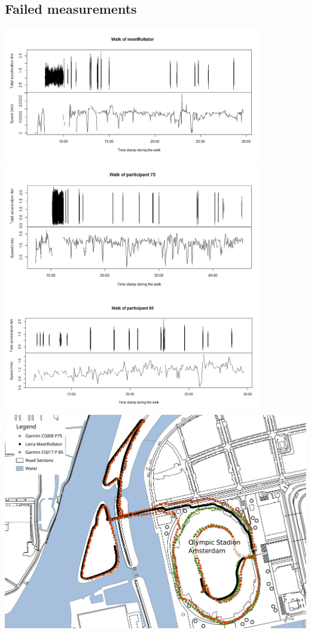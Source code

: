 \begin{appendix}
\clearpage

\section{Failed measurements}\label{Afailed}
\includegraphics[width=0.85\textwidth]{img/annex/walkmeetrollator.jpeg}
\includegraphics[width=0.85\textwidth]{img/annex/walkpart75.jpeg}
\includegraphics[width=0.85\textwidth]{img/annex/walkpart85.jpeg}
\includegraphics[width=\textwidth]{img/annex/A_failedmeasurementsMap.pdf}


\end{appendix}
